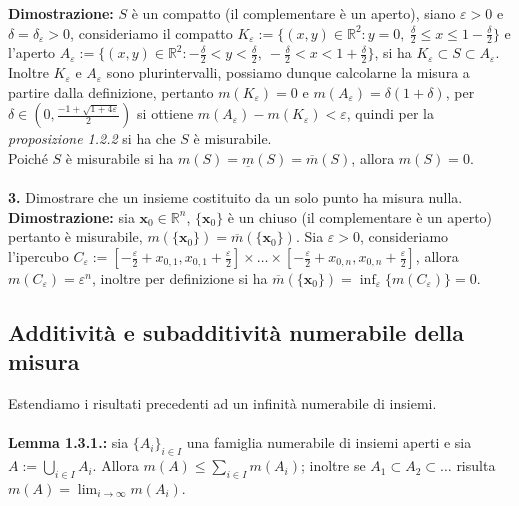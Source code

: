 \documentclass{article}
\numberwithin{equation}{subsection}
\begin{document}
\textbf{Dimostrazione:} $S$ è un compatto (il complementare è un aperto), siano $\varepsilon > 0$ e $\delta = \delta_\varepsilon > 0$, consideriamo il compatto $K_\varepsilon := \{ (x, y) \in \mathbb{R}^2 : y = 0, \ \frac{\delta}{2} \leq x \leq 1 - \frac{\delta}{2} \}$ e l'aperto $A_\varepsilon := \{ (x, y) \in \mathbb{R}^2 : -\frac{\delta}{2} < y < \frac{\delta}{2}, \ -\frac{\delta}{2} < x < 1 + \frac{\delta}{2} \}$, si ha $K_\varepsilon \subset S \subset A_\varepsilon$. Inoltre $K_\varepsilon$ e $A_\varepsilon$ sono plurintervalli, possiamo dunque calcolarne la misura a partire dalla definizione, pertanto $m(K_\varepsilon) = 0$ e $m(A_\varepsilon) = \delta(1 + \delta)$, per $\delta \in \left( 0, \frac{-1 + \sqrt{1 + 4\varepsilon}}{2} \right)$ si ottiene $m(A_\varepsilon) - m(K_\varepsilon) < \varepsilon$, quindi per la \textit{proposizione 1.2.2} si ha che $S$ è misurabile. \\
Poiché $S$ è misurabile si ha $m(S) = \underline{m}(S) = \overline{m}(S)$, allora $m(S) = 0$. \\ \\
\textbf{3.} Dimostrare che un insieme costituito da un solo punto ha misura nulla. \\

\textbf{Dimostrazione:} sia $\mathbf{x}_0 \in \mathbb{R}^n$, $\{ \mathbf{x}_0 \}$ è un chiuso (il complementare è un aperto) pertanto è misurabile, $m(\{ \mathbf{x}_0 \}) = \overline{m}(\{ \mathbf{x}_0 \})$. Sia $\varepsilon > 0$, consideriamo l'ipercubo $C_\varepsilon := [-\frac{\varepsilon}{2} + x_{0,1}, x_{0, 1} + \frac{\varepsilon}{2}] \times \dots \times [-\frac{\varepsilon}{2} + x_{0, n}, x_{0, n} + \frac{\varepsilon}{2}]$, allora $m(C_\varepsilon) = \varepsilon^n$, inoltre per definizione si ha $\overline{m}(\{ \mathbf{x}_0 \}) = \inf_\varepsilon \{m(C_\varepsilon)\} = 0$. \newpage
\subsection{Additività e subadditività numerabile della misura}
Estendiamo i risultati precedenti ad un infinità numerabile di insiemi. \\ \\
\textbf{Lemma 1.3.1.:} sia $\{ A_i \}_{i \in I}$ una famiglia numerabile di insiemi aperti e sia $A := \bigcup_{i \in I} A_i$. Allora $m(A) \leq \sum_{i \in I} m(A_i)$; inoltre se $A_1 \subset A_2 \subset \dots$ risulta $m(A) = \lim_{i \rightarrow \infty} m(A_i)$. \\
\end{document}
